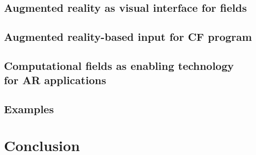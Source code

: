 \documentclass[presentation]{beamer} %
\begin{document}
\subsection{Augmented reality as visual interface for fields}
\subsection{Augmented reality-based input for CF program}
\subsection{Computational fields as enabling technology for AR applications}
\subsection{Examples}
\section{Conclusion}



\section*{\refname}
\begin{frame}[allowframebreaks]
  \frametitle{\refname}
  \scriptsize
  
  
\end{frame}
\section*{\refname}
\end{document}
